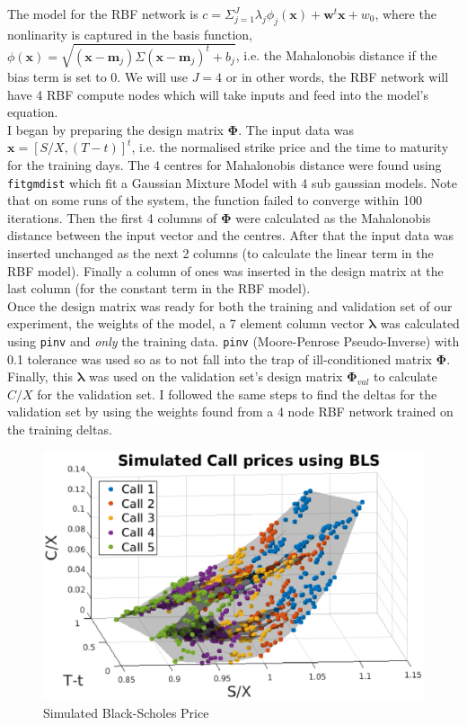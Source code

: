 \documentclass[11pt, fleqn]{article}
\begin{document}
The model for the RBF network is $c = \Sigma_{j=1}^J\lambda_j\phi_j(\bm{x}) + \bm{w}^t\bm{x} + w_0$, where the nonlinarity is captured in the basis function, $\phi(\bm{x}) = \sqrt{(\bm{x} - \bm{m}_j)\Sigma(\bm{x} - \bm{m}_j)^t + b_j}$, i.e. the Mahalonobis distance if the bias term is set to 0. We will use $J = 4$ or in other words, the RBF network will have 4 RBF compute nodes which will take inputs and feed into the model's equation.\\

I began by preparing the design matrix $\bm{\Phi}$. The input data was $\bm{x} = [S/X, (T-t)]^t$, i.e. the normalised strike price and the time to maturity for the training days. The 4 centres for Mahalonobis distance were found using \texttt{fitgmdist} which fit a Gaussian Mixture Model with 4 sub gaussian models. Note that on some runs of the system, the function failed to converge within 100 iterations. Then the first 4 columns of $\bm{\Phi}$ were calculated as the Mahalonobis distance between the input vector and the centres. After that the input data was inserted unchanged as the next 2 columns (to calculate the linear term in the RBF model). Finally a column of ones was inserted in the design matrix at the last column (for the constant term in the RBF model).\\

Once the design matrix was ready for both the training and validation set of our experiment, the weights of the model, a 7 element column vector $\bm{\lambda}$ was calculated using \texttt{pinv} and \textit{only} the training data. \texttt{pinv} (Moore-Penrose Pseudo-Inverse) with 0.1 tolerance was used so as to not fall into the trap of ill-conditioned matrix $\bm{\Phi}$. Finally, this $\bm{\lambda}$ was used on the validation set's design matrix $\bm{\Phi}_{val}$ to calculate $C/X$ for the validation set. I followed the same steps to find the deltas for the validation set by using the weights found from a 4 node RBF network trained on the training deltas.\\

\begin{figure}[!h]
\begin{center}
	\includegraphics[scale=.6] {q1_simulated_bls.eps}
	\caption{Simulated Black-Scholes Price}
	\label{fig:q1-simulated-bls}
\end{center}
\end{figure}
\end{document}
